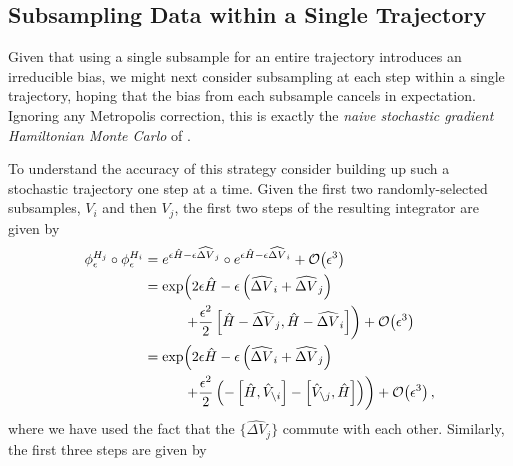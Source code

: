 \documentclass{article}
\begin{document}
\subsection{Subsampling Data within a Single Trajectory}

Given that using a single subsample for an entire trajectory introduces an
irreducible bias, we might next consider subsampling at each step within
a single trajectory, hoping that the bias from each subsample cancels
in expectation.  Ignoring any Metropolis correction, this is exactly the
\textit{naive stochastic gradient Hamiltonian Monte Carlo} of \cite{ChenEtAl:2014}.

To understand the accuracy of this strategy consider building up such a 
stochastic trajectory one step at a time.  Given the first two randomly-selected 
subsamples, $V_{i}$ and then $V_{j}$, the first two steps of the resulting
integrator are given by
%
\begin{align*}
\phi^{H_{j}}_{\epsilon} \circ \phi^{H_{i}}_{\epsilon}
&=
e^{ \epsilon \hat{H} - \epsilon  \widehat{ \Delta V}_{j} } 
\circ e^{ \epsilon \hat{H} - \epsilon  \widehat{ \Delta V}_{i} }
+ \mathcal{O} \! \left( \epsilon^{3} \right)
\\
&=
\exp \! \left( 
2 \epsilon \hat{H} - \epsilon \left(  \widehat{ \Delta V}_{i} +  \widehat{ \Delta V}_{j} \right)
\right.
\\
& \hspace{10mm} \left.
+ \frac{\epsilon^{2}}{2} \left[ \hat{H} -  \widehat{ \Delta V}_{j}, \hat{H} - \widehat{ \Delta V}_{i} \right]
\right)
+ \mathcal{O} \! \left( \epsilon^{3} \right)
\\
&=
\exp \! \left( 
2 \epsilon \hat{H} - \epsilon \left( \widehat{ \Delta V}_{i} + \widehat{ \Delta V}_{j} \right)
\right.
\\
& \hspace{10mm} \left.
+ \frac{\epsilon^{2}}{2} \left(
- \left[ \hat{H}, \hat{V}_{\setminus i} \right]
- \left[ \hat{V}_{\setminus j}, \hat{H} \right] \right) \right)
+ \mathcal{O} \! \left( \epsilon^{3} \right),
\end{align*}
%
where we have used the fact that the $\{ \widehat{ \Delta V}_{j} \}$ commute
with each other.  Similarly, the first three steps are given by
%
\end{document}
